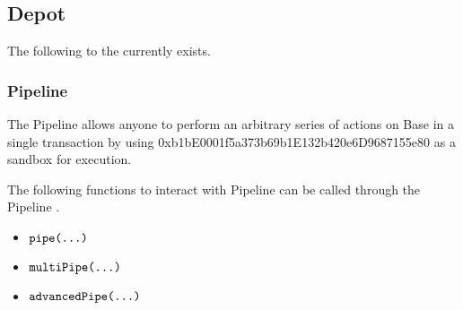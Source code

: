 \documentclass[class=article, crop=false]{standalone}
\begin{document}

\subsection{Depot}

The following  to the  currently exists.


\subsubsection{Pipeline}

The Pipeline  allows anyone to perform an arbitrary series of actions on Base in a single transaction by using 0xb1bE0001f5a373b69b1E132b420e6D9687155e80 as a sandbox for execution.

The following functions to interact with Pipeline can be called through the Pipeline .
\begin{itemize}
    \item $\texttt{pipe(...)}$
    \item $\texttt{multiPipe(...)}$
    \item $\texttt{advancedPipe(...)}$
\end{itemize}
\end{document}
